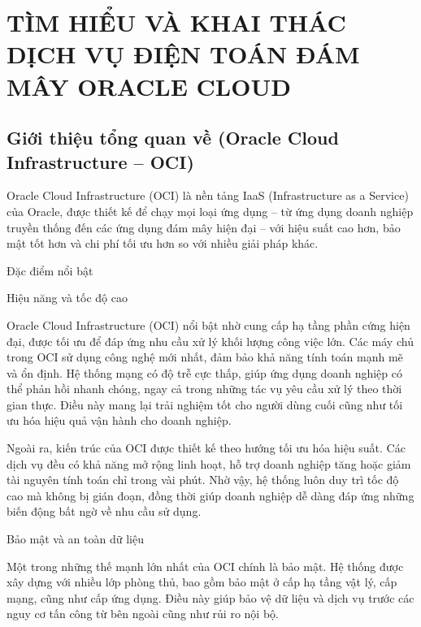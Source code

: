 \section{TÌM HIỂU VÀ KHAI THÁC DỊCH VỤ ĐIỆN TOÁN ĐÁM MÂY ORACLE CLOUD}
\subsection{Giới thiệu tổng quan về (Oracle Cloud Infrastructure – OCI)}
Oracle Cloud Infrastructure (OCI) là nền tảng IaaS (Infrastructure as a Service) của Oracle, được thiết kế để chạy mọi loại ứng dụng – từ ứng dụng doanh nghiệp truyền thống đến các ứng dụng đám mây hiện đại – với hiệu suất cao hơn, bảo mật tốt hơn và chi phí tối ưu hơn so với nhiều giải pháp khác.

Đặc điểm nổi bật

\begin{myitem}
\item Hiệu năng và tốc độ cao

  \begin{mysubitem}
    \item Oracle Cloud Infrastructure (OCI) nổi bật nhờ cung cấp hạ tầng phần cứng hiện đại, được tối ưu để đáp ứng nhu cầu xử lý khối lượng công việc lớn. Các máy chủ trong OCI sử dụng công nghệ mới nhất, đảm bảo khả năng tính toán mạnh mẽ và ổn định. Hệ thống mạng có độ trễ cực thấp, giúp ứng dụng doanh nghiệp có thể phản hồi nhanh chóng, ngay cả trong những tác vụ yêu cầu xử lý theo thời gian thực. Điều này mang lại trải nghiệm tốt cho người dùng cuối cũng như tối ưu hóa hiệu quả vận hành cho doanh nghiệp.
    
    \item Ngoài ra, kiến trúc của OCI được thiết kế theo hướng tối ưu hóa hiệu suất. Các dịch vụ đều có khả năng mở rộng linh hoạt, hỗ trợ doanh nghiệp tăng hoặc giảm tài nguyên tính toán chỉ trong vài phút. Nhờ vậy, hệ thống luôn duy trì tốc độ cao mà không bị gián đoạn, đồng thời giúp doanh nghiệp dễ dàng đáp ứng những biến động bất ngờ về nhu cầu sử dụng.

  \end{mysubitem}

\item Bảo mật và an toàn dữ liệu

  \begin{mysubitem}
    \item Một trong những thế mạnh lớn nhất của OCI chính là bảo mật. Hệ thống được xây dựng với nhiều lớp phòng thủ, bao gồm bảo mật ở cấp hạ tầng vật lý, cấp mạng, cũng như cấp ứng dụng. Điều này giúp bảo vệ dữ liệu và dịch vụ trước các nguy cơ tấn công từ bên ngoài cũng như rủi ro nội bộ.
    

\end{mysubitem}
\end{myitem}
